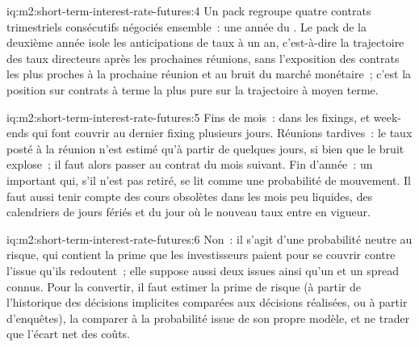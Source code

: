 \begin{solution}{iq:m2:short-term-interest-rate-futures:4}
Un pack regroupe quatre contrats trimestriels consécutifs négociés ensemble~: une année
du . Le pack de la deuxième année isole les anticipations de taux à un an,
c'est-à-dire la trajectoire des taux directeurs après les prochaines réunions, sans l'exposition
des contrats les plus proches à la prochaine réunion et au bruit du marché monétaire~; c'est la position sur contrats à terme
la plus pure sur la trajectoire à moyen terme.
\end{solution}

\begin{solution}{iq:m2:short-term-interest-rate-futures:5}
Fins de mois~:  dans les fixings, et week-ends qui font couvrir au dernier fixing
plusieurs jours. Réunions tardives~: le taux posté à la réunion n'est estimé qu'à partir de quelques jours, si bien que le bruit explose~;
il faut alors passer au contrat du mois suivant. Fin d'année~: un  important qui, s'il n'est pas retiré,
se lit comme une probabilité de mouvement. Il faut aussi tenir compte des cours obsolètes dans les mois peu liquides,
des calendriers de jours fériés
et du jour où le nouveau taux entre en vigueur.
\end{solution}

\begin{solution}{iq:m2:short-term-interest-rate-futures:6}
Non~: il s'agit d'une probabilité neutre au risque, qui contient la prime que les investisseurs paient pour
se couvrir contre l'issue qu'ils redoutent~; elle suppose aussi deux issues ainsi qu'un  et un spread connus.
Pour la convertir, il faut estimer la prime de risque (à partir de l'historique des décisions implicites
comparées aux décisions réalisées, ou à partir d'enquêtes), la comparer à la probabilité issue de son propre modèle,
et ne trader que l'écart net des coûts.
\end{solution}
